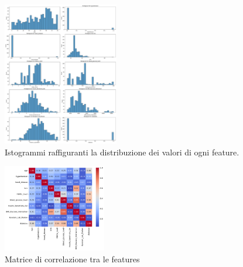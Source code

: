 \documentclass[conference]{IEEEtran}
\begin{document}
\begin{figure}[htbp]
    \centering
    \includegraphics[width=0.45\textwidth]{hist_features.pdf}
    \caption{Istogrammi raffiguranti la distribuzione dei valori di ogni feature.}
    \label{hist}
\end{figure}

\begin{figure}[htbp]
    \centering
    \includegraphics[width=0.40\textwidth]{CorrelationMatrix.pdf}
    \caption{Matrice di correlazione tra le features}
    \label{correlation}
\end{figure}
\end{document}
